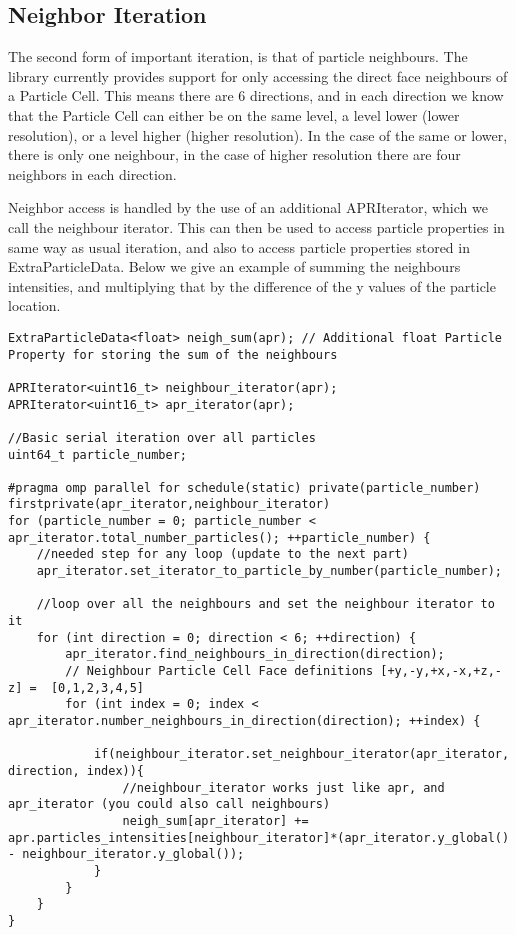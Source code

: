 \documentclass[12pt]{article}
\begin{document}
\subsection{Neighbor Iteration}
The second form of important iteration, is that of particle neighbours. The library currently provides support for only accessing the direct face neighbours of a Particle Cell. This means there are 6 directions, and in each direction we know that the Particle Cell can either be on the same level, a level lower (lower resolution), or a level higher (higher resolution). In the case of the same or lower, there is only one neighbour, in the case of higher resolution there are four neighbors in each direction.

Neighbor access is handled by the use of an additional APRIterator, which we call the neighbour iterator. This can then be used to access particle properties in same way as usual iteration, and also to access particle properties stored in ExtraParticleData. Below we give an example of summing the neighbours intensities, and multiplying that by the difference of the y values of the particle location.
\begin{lstlisting}
ExtraParticleData<float> neigh_sum(apr); // Additional float Particle Property for storing the sum of the neighbours

APRIterator<uint16_t> neighbour_iterator(apr);
APRIterator<uint16_t> apr_iterator(apr);

//Basic serial iteration over all particles
uint64_t particle_number;

#pragma omp parallel for schedule(static) private(particle_number) firstprivate(apr_iterator,neighbour_iterator)
for (particle_number = 0; particle_number < apr_iterator.total_number_particles(); ++particle_number) {
	//needed step for any loop (update to the next part)
	apr_iterator.set_iterator_to_particle_by_number(particle_number);

	//loop over all the neighbours and set the neighbour iterator to it
	for (int direction = 0; direction < 6; ++direction) {
		apr_iterator.find_neighbours_in_direction(direction);
		// Neighbour Particle Cell Face definitions [+y,-y,+x,-x,+z,-z] =  [0,1,2,3,4,5]
		for (int index = 0; index < apr_iterator.number_neighbours_in_direction(direction); ++index) {

			if(neighbour_iterator.set_neighbour_iterator(apr_iterator, direction, index)){
				//neighbour_iterator works just like apr, and apr_iterator (you could also call neighbours)
				neigh_sum[apr_iterator] += apr.particles_intensities[neighbour_iterator]*(apr_iterator.y_global() - neighbour_iterator.y_global());
			}
		}
	}
}
\end{lstlisting}
\end{document}
